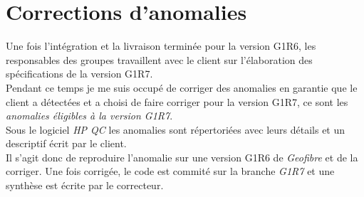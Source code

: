 \section{Corrections d'anomalies}
Une fois l'intégration et la livraison terminée pour la version G1R6, les responsables des groupes travaillent avec le client sur l'élaboration des spécifications de la version G1R7.
\\Pendant ce temps je me suis occupé de corriger des anomalies en garantie que le client a détectées et a choisi de faire corriger pour la version G1R7, ce sont les \textit{anomalies éligibles à la version G1R7}.
\\Sous le logiciel \textit{HP QC} les anomalies sont répertoriées avec leurs détails et un descriptif écrit par le client.
\\Il s'agit donc de reproduire l'anomalie sur une version G1R6 de \textit{Geofibre} et de la corriger. Une fois corrigée, le code est commité sur la branche \textit{G1R7} et une synthèse est écrite par le correcteur.
\\\\
\noindent%
\begin{minipage}{\linewidth}%
\label{visina8}%
\end{minipage}\\
